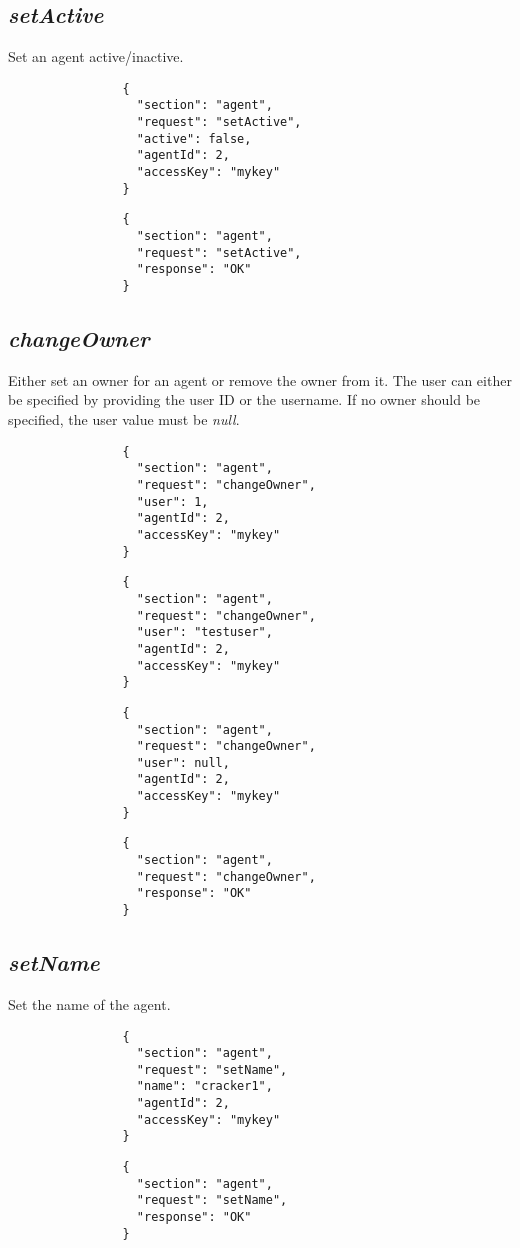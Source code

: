 		\subsection*{\textit{setActive}}
			Set an agent active/inactive. 
			{
				\color{blue}
				\begin{verbatim}
				{
				  "section": "agent",
				  "request": "setActive",
				  "active": false,
				  "agentId": 2,
				  "accessKey": "mykey"
				}
				\end{verbatim}
			}
			{
				\color{OliveGreen}
				\begin{verbatim}
				{
				  "section": "agent",
				  "request": "setActive",
				  "response": "OK"
				}
				\end{verbatim}
			}
		\subsection*{\textit{changeOwner}}
			Either set an owner for an agent or remove the owner from it. The user can either be specified by providing the user ID or the username. If no owner should be specified, the user value must be \textit{null}.
			{
				\color{blue}
				\begin{verbatim}
				{
				  "section": "agent",
				  "request": "changeOwner",
				  "user": 1,
				  "agentId": 2,
				  "accessKey": "mykey"
				}
				\end{verbatim}
			}
			{
				\color{blue}
				\begin{verbatim}
				{
				  "section": "agent",
				  "request": "changeOwner",
				  "user": "testuser",
				  "agentId": 2,
				  "accessKey": "mykey"
				}
				\end{verbatim}
			}
			{
				\color{blue}
				\begin{verbatim}
				{
				  "section": "agent",
				  "request": "changeOwner",
				  "user": null,
				  "agentId": 2,
				  "accessKey": "mykey"
				}
				\end{verbatim}
			}
			{
				\color{OliveGreen}
				\begin{verbatim}
				{
				  "section": "agent",
				  "request": "changeOwner",
				  "response": "OK"
				}
				\end{verbatim}
			}
		\subsection*{\textit{setName}}
			Set the name of the agent.
			{
				\color{blue}
				\begin{verbatim}
				{
				  "section": "agent",
				  "request": "setName",
				  "name": "cracker1",
				  "agentId": 2,
				  "accessKey": "mykey"
				}
				\end{verbatim}
			}
			{
				\color{OliveGreen}
				\begin{verbatim}
				{
				  "section": "agent",
				  "request": "setName",
				  "response": "OK"
				}
				\end{verbatim}
			}
